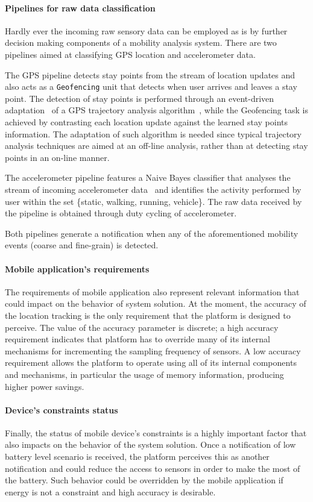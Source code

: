\documentclass[ENG,PhD]{cinvestav}
\begin{document}
\paragraph{Pipelines for raw data classification}
Hardly ever the incoming raw sensory data can be employed as is by further decision making components of a mobility analysis system.
There are two pipelines aimed at classifying GPS location and accelerometer data. 

The GPS pipeline detects stay points from the stream of location updates and also acts as a \texttt{Geofencing} unit that detects when user arrives and leaves a stay point.
The detection of stay points is performed through an event-driven adaptation~\cite{Perez-Torres2016b} of a GPS trajectory analysis algorithm~\cite{Li2008,Ye2009}, while the Geofencing task is achieved by contrasting each location update against the learned stay points information.
The adaptation of such algorithm is needed since typical trajectory analysis techniques are aimed at an off-line analysis, rather than at detecting stay points in an on-line manner.

The accelerometer pipeline features a Naive Bayes classifier that analyses the stream of incoming accelerometer data~\cite{Torres-Huitzil2015} and identifies the activity performed by user within the set \{static, walking, running, vehicle\}.
The raw data received by the pipeline is obtained through duty cycling of accelerometer.

Both pipelines generate a notification when any of the aforementioned mobility events (coarse and fine-grain) is detected.

\paragraph{Mobile application's requirements}
The requirements of mobile application also represent relevant information that could impact on the behavior of system solution.
At the moment, the accuracy of the location tracking is the only requirement that the platform is designed to perceive.
The value of the accuracy parameter is discrete; a high accuracy requirement indicates that platform has to override many of its internal mechanisms for incrementing the sampling frequency of sensors.
A low accuracy requirement allows the platform to operate using all of its internal components and mechanisms, in particular the usage of memory information, producing higher power savings.

\paragraph{Device's constraints status} 
Finally, the status of mobile device's constraints is a highly important factor that also impacts on the behavior of the system solution.
Once a notification of low battery level scenario is received, the platform perceives this as another notification and could reduce the access to sensors in order to make the most of the battery.
Such behavior could be overridden by the mobile application if energy is not a constraint and high accuracy is desirable.
\end{document}
